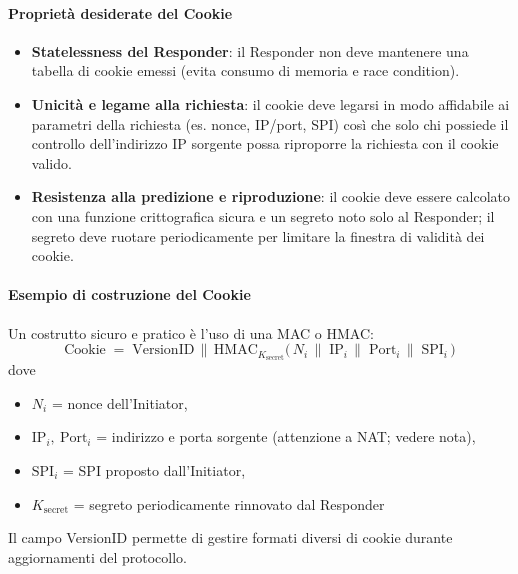 \documentclass[a4paper, 11pt]{article}
\begin{document}
\paragraph{Proprietà desiderate del Cookie}
\begin{itemize}
    \item \textbf{Statelessness del Responder}: il Responder non deve mantenere una tabella di cookie emessi (evita consumo di memoria e race condition).
    \item \textbf{Unicità e legame alla richiesta}: il cookie deve legarsi in modo affidabile ai parametri della richiesta (es. nonce, IP/port, SPI) così che solo chi possiede il controllo dell'indirizzo IP sorgente possa riproporre la richiesta con il cookie valido.
    \item \textbf{Resistenza alla predizione e riproduzione}: il cookie deve essere calcolato con una funzione crittografica sicura e un segreto noto solo al Responder; il segreto deve ruotare periodicamente per limitare la finestra di validità dei cookie.
\end{itemize}

\paragraph{Esempio di costruzione del Cookie}
Un costrutto sicuro e pratico è l'uso di una MAC o HMAC:
\[
    \text{Cookie} \;=\; \text{VersionID} \,\|\, \text{HMAC}_{K_{\text{secret}}}\big(\,N_i \,\|\; \text{IP}_i \,\|\; \text{Port}_i \,\|\; \text{SPI}_i \,\big)
\]
dove
\begin{itemize}
    \item \(N_i\) = nonce dell'Initiator,
    \item \(\text{IP}_i,\ \text{Port}_i\) = indirizzo e porta sorgente (attenzione a NAT; vedere nota),
    \item \(\text{SPI}_i\) = SPI proposto dall'Initiator,
    \item \(K_{\text{secret}}\) = segreto periodicamente rinnovato dal Responder
\end{itemize}

Il campo VersionID permette di gestire formati diversi di cookie durante aggiornamenti del protocollo.
\end{document}
